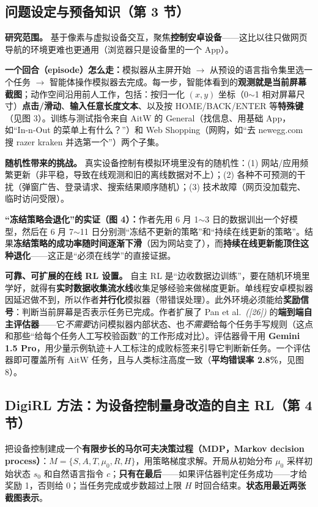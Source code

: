 \documentclass[11pt,UTF8,fontset=fandol]{ctexart}
\newcommand{\ennote}[1]{\textit{\small(#1)}}
\begin{document}
\subsection{问题设定与预备知识（第 3 节）}

\textbf{研究范围。} 基于像素与虚拟设备交互，聚焦\textbf{控制安卓设备}——这比以往只做网页导航的环境更难也更通用（浏览器只是设备里的一个 App）。

\textbf{一个回合（episode）怎么走：}模拟器从主屏开始 $\rightarrow$ 从预设的语言指令集里选一个任务 $\rightarrow$ 智能体操作模拟器去完成。每一步，智能体看到的\textbf{观测就是当前屏幕截图}；动作空间沿用前人工作，包括：按归一化 $(x,y)$ 坐标（0$\sim$1 相对屏幕尺寸）\textbf{点击/滑动}、\textbf{输入任意长度文本}、以及按 HOME/BACK/ENTER 等\textbf{特殊键}（见图 3）。训练与测试指令来自 AitW 的 General（找信息、用基础 App，如“In-n-Out 的菜单上有什么？”）和 Web Shopping（网购，如“去 newegg.com 搜 razer kraken 并选第一个”）两个子集。

\textbf{随机性带来的挑战。} 真实设备控制有模拟环境里没有的随机性：(1) 网站/应用频繁更新（非平稳，导致在线观测和旧的离线数据对不上）；(2) 各种不可预测的干扰（弹窗广告、登录请求、搜索结果顺序随机）；(3) 技术故障（网页没加载完、临时访问受限）。

\textbf{“冻结策略会退化”的实证（图 4）：}作者先用 6 月 1$\sim$3 日的数据训出一个好模型，然后在 6 月 7$\sim$11 日分别测“冻结不更新的策略”和“持续在线更新的策略”。结果\textbf{冻结策略的成功率随时间逐渐下滑}（因为网站变了），而\textbf{持续在线更新能顶住这种退化}——这正是“必须在线学”的直接证据。

\textbf{可靠、可扩展的在线 RL 设置。} 自主 RL 是“边收数据边训练”，要在随机环境里学好，就得有\textbf{实时数据收集流水线}收集足够经验来做梯度更新。单线程安卓模拟器因延迟做不到，所以作者\textbf{并行化}模拟器（带错误处理）。此外环境必须能给\textbf{奖励信号}：判断当前屏幕是否表示任务已完成。作者扩展了 Pan et al.\ \ennote{[26]} 的\textbf{端到端自主评估器}——它\emph{不需要}访问模拟器内部状态、也\emph{不需要}给每个任务手写规则（这点和那些“给每个任务人工写校验函数”的工作形成对比）。评估器骨干用 \textbf{Gemini 1.5 Pro}，用少量示例轨迹＋人工标注的成败标签来引导它判断新任务。一个评估器即可覆盖所有 AitW 任务，且与人类标注高度一致（\textbf{平均错误率 2.8\%}，见图 8）。

\subsection{DigiRL 方法：为设备控制量身改造的自主 RL（第 4 节）}

把设备控制建成一个\textbf{有限步长的马尔可夫决策过程（MDP，Markov decision process）}：$M=\{S,A,T,\mu_0,R,H\}$，用策略梯度求解。开局从初始分布 $\mu_0$ 采样初始状态 $s_0$ 和自然语言指令 $c$；\textbf{只有在最后}——如果评估器判定任务成功——才给奖励 1，否则给 0；当任务完成或步数超过上限 $H$ 时回合结束。\textbf{状态用最近两张截图表示}。
\end{document}
